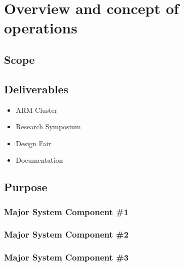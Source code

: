 
\chapter{Overview and concept of operations}



\section{Scope}

\section{Deliverables}
\begin{itemize}
	\item ARM Cluster
	\item Research Symposium
	\item Design Fair
	\item Documentation
\end{itemize}

\section{Purpose}

\subsection{Major System Component \#1}

\subsection{Major System Component \#2}

\subsection{Major System Component \#3}

